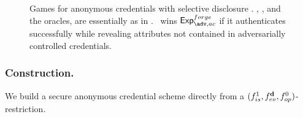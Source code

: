 \begin{figure}[ht!]
  \centering
  \caption{Games for anonymous credentials with selective disclosure
    \cite{fhs19}. \OWNR, \ATTR, and the oracles, are essentially as in
    \UAS. \adv~wins $\Exp^{forge}_{\adv,ac}$ if it authenticates successfully
    while revealing attributes not contained in adversarially controlled
    credentials.}
  \label{fig:model-ac}  
\end{figure}

\subsubsection{\CUASAC Construction.} %
We build a secure anonymous credential scheme directly from a
$(f_{is}^1,f_{ev}^{\mathbf{d}},f_{op}^0)$-\CUASGenInt restriction.

